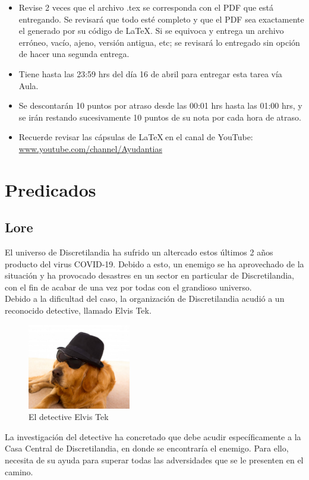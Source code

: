 \documentclass[letterpaper,10pt]{article}
\begin{document}
\begin{itemize}
    \item Revise 2 veces que el archivo .tex se corresponda con el PDF que está entregando. Se revisará que todo esté completo y que el PDF sea exactamente el generado por su código de \LaTeX . Si se equivoca y entrega un archivo erróneo, vacío, ajeno, versión antigua, etc; se revisará lo entregado sin opción de hacer una segunda entrega.
    
        
    \item Tiene hasta las 23:59 hrs del día 16 de abril para entregar esta tarea vía Aula.
    
    \item Se descontarán 10 puntos por atraso desde las 00:01 hrs hasta las 01:00 hrs, y se irán restando sucesivamente 10 puntos de su nota por cada hora de atraso.
    
    \item Recuerde revisar las cápsulas de \LaTeX $~$en el canal de YouTube:
    \href{https://www.youtube.com/channel/UCvrv1uJmkRp0l_57flzG7Sg}{www.youtube.com/channel/Ayudantias}

    
\end{itemize}
\newpage
\section{Predicados}
\subsection{Lore}
El universo de Discretilandia ha sufrido un altercado estos últimos 2 años producto del virus COVID-19. Debido a esto, un enemigo se ha aprovechado de la situación y ha provocado desastres en un sector en particular de Discretilandia, con el fin de acabar de una vez por todas con el grandioso universo. 
\\[0.1cm]
Debido a la dificultad del caso, la organización de Discretilandia acudió a un reconocido detective, llamado Elvis Tek.
\begin{figure}[H]
    \centering
    \includegraphics[width=0.4\textwidth]{disfraz-detective.jpg}
    \caption{El detective Elvis Tek }
    \label{superheroe}
\end{figure}
La investigación del detective ha concretado que debe acudir específicamente a la Casa Central de Discretilandia, en donde se encontraría el enemigo. Para ello, necesita de su ayuda para superar todas las adversidades que se le presenten en el camino.
\end{document}
